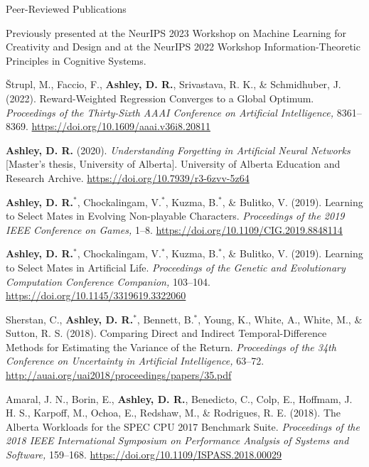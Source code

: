 \documentclass{cv}
\begin{document}
\begin{rSection}{Peer-Reviewed Publications}
\begin{rPublications}
        \vspace{-0.4em}
        Previously presented at the NeurIPS 2023 Workshop on Machine Learning for Creativity and Design and at the NeurIPS 2022 Workshop Information-Theoretic Principles in Cognitive Systems.
    \item
        {\v{S}}trupl, M., Faccio, F., \textbf{Ashley, D. R.}, Srivastava, R. K., \& Schmidhuber, J.
        (2022).
        Reward-Weighted Regression Converges to a Global Optimum.
        \textit{Proceedings of the Thirty-Sixth AAAI Conference on Artificial Intelligence,} 8361--8369.
        \url{https://doi.org/10.1609/aaai.v36i8.20811}
    \item
        \textbf{Ashley, D. R.}
        (2020).
        \textit{Understanding Forgetting in Artificial Neural Networks} [Master's thesis, University of Alberta].
        University of Alberta Education and Research Archive.
        \url{https://doi.org/10.7939/r3-6zvv-5z64}
    \item
        \textbf{Ashley, D. R.}$^*$, Chockalingam, V.$^*$, Kuzma, B.$^*$, \& Bulitko, V.
        (2019).
        Learning to Select Mates in Evolving Non-playable Characters.
        \textit{Proceedings of the 2019 IEEE Conference on Games,} 1--8.
        \url{https://doi.org/10.1109/CIG.2019.8848114}
    \item
        \textbf{Ashley, D. R.}$^*$, Chockalingam, V.$^*$, Kuzma, B.$^*$, \& Bulitko, V.
        (2019).
        Learning to Select Mates in Artificial Life.
        \textit{Proceedings of the Genetic and Evolutionary Computation Conference Companion,} 103--104.
        \url{https://doi.org/10.1145/3319619.3322060}
    \item
        Sherstan, C., \textbf{Ashley, D. R.}$^*$, Bennett, B.$^*$, Young, K., White, A., White, M., \& Sutton, R. S.
        (2018).
        Comparing Direct and Indirect Temporal-Difference Methods for Estimating the Variance of the Return.
        \textit{Proceedings of the 34th Conference on Uncertainty in Artificial Intelligence,} 63--72.
        \url{http://auai.org/uai2018/proceedings/papers/35.pdf}
    \item
        Amaral, J. N., Borin, E., \textbf{Ashley, D. R.}, Benedicto, C., Colp, E., Hoffmam, J. H. S., Karpoff, M., Ochoa, E., Redshaw, M., \& Rodrigues, R. E.
        (2018).
        The Alberta Workloads for the SPEC CPU 2017 Benchmark Suite.
        \textit{Proceedings of the 2018 IEEE International Symposium on Performance Analysis of Systems and Software,} 159--168.
        \url{https://doi.org/10.1109/ISPASS.2018.00029}
\end{rPublications}

\end{rSection}
\end{document}
